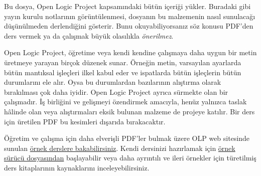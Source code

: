 

\clearpage

\begin{editorial}
Bu dosya, Open Logic Project kapsamındaki bütün içeriği yükler. Buradaki gibi
yayın kurulu notlarının görüntülenmesi, dosyanın bu malzemenin nasıl sunulacağı
düşünülmeden derlendiğini gösterir. Bunu okuyabiliyorsanız söz konusu PDF'den
ders vermek ya da çalışmak büyük olasılıkla \emph{önerilmez}.

Open Logic Project, öğretime veya kendi kendine çalışmaya daha uygun bir metin üretmeye
yarayan birçok düzenek sunar. Örneğin metin, varsayılan ayarlarda bütün
mantıksal işleçleri ilkel kabul eder ve ispatlarda bütün işleçlerin bütün
durumlarını ele alır. Oysa bu durumlardan bazılarının alıştırma olarak
bırakılması çok daha iyidir. Open Logic Project ayrıca sürmekte olan bir
çalışmadır. İş birliğini ve gelişmeyi özendirmek amacıyla, henüz yalnızca taslak
hâlinde olan veya alıştırmaları eksik bulunan malzeme de projeye katılır. Bir
ders için üretilen PDF bu kesimleri dışarıda bırakacaktır.

Öğretim ve çalışma için daha elverişli PDF'ler bulmak üzere OLP web sitesinde
sunulan
\href{http://builds.openlogicproject.org/}{örnek derslere bakabilirsiniz}.
Kendi dersinizi hazırlamak için
\href{https://github.com/OpenLogicProject/OpenLogic/tree/master/courses/sample}{örnek
  sürücü dosyasından} başlayabilir veya daha ayrıntılı ve ileri örnekler için
türetilmiş ders kitaplarının kaynaklarını inceleyebilirsiniz.
\end{editorial}



















